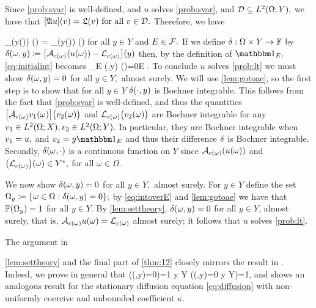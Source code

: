   

Since \cref{prob:svar} is well-defined, and $u$ solves \cref{prob:svar}, and $\D \subseteq \LtOY,$ we have that $\mleft[\SA u\mright](v) = \SL(v) \tforall v \in \D.$ Therefore, we have

\beq\label{eq:initialint}
\int_\Omega {}\mleft(y(\omega)\mright) \dd\PP(\omega) = \int_\Omega \mleft[\Lcomega\mright]\mleft(y(\omega)\mright) \dd\PP(\omega)
\eeq
for all $y \in Y$ and $E \in \mathcal F.$ If we define $\delta:\Omega\times Y \rightarrow \mathbb F$ by $\diff(\omega,y) \de \mleft[\Acomega\mleft(u(\omega)\mright) - \Lcomega\mright]\mleft(y\mright)$ then, by the definition of $\Ind{E},$ \eqref{eq:initialint} becomes
\beq\label{eq:intoverE}
\int_E \diff(\omega,y) \dd\PP(\omega)=0\quad \tforall E \in \cF.
\eeq
 To conclude $u$ solves \cref{prob:lt} we must show $\delta(\omega,y)=0$ for all $y \in Y,$ almost surely. We will use \cref{lem:gotoae}, so the first step is to show that for all $y \in Y$ $\delta(\cdot,y)$ is Bochner integrable. This follows from the fact that \cref{prob:svar} is well-defined, and thus the quantities $\big[\Acomega \vo(\omega)\big]\big(\vt(\omega)\big)$ and $\Lcomega\big(\vt(\omega)\big)$ are Bochner integrable for any $\vo\in \LtOX,\vt \in \LtOY.$ In particular, they are Bochner integrable when $v_{1}=u,$ and $\vt=y\Ind{E}$ and thus their difference $\delta$ is Bochner integrable. Secondly, $\delta(\omega,\cdot)$ is a continuous function on $Y$ since $\Acomega\mleft(u(\omega)\mright)$ and $\mleft(\Lcomega\mright)(\omega) \in \Ys,$ for all $\omega \in \Omega.$

We now show $\delta(\omega,y)=0$ for all $y \in Y,$ almost surely. For $y \in Y$ define the set $\Omegay \de \set{\omega \in \Omega \st \diff(\omega,y)=0};$ by \eqref{eq:intoverE} and \cref{lem:gotoae} we have that $\mathbb P(\Omega_{y})=1$ for all $y \in Y.$ By \cref{lem:settheory}, $  \delta(\omega,y)=0$ for all $y \in Y$, almost surely, that is, $\Acomega u(\omega) = \Lcomega$ almost surely; it follows that $u$ solves \cref{prob:lt}.
\epf

The argument in 

\noindent \cref{lem:settheory} and the final part of \cref{thm:12} closely mirrors the result in \cite[Remark 2.2]{MuSt:11}. Indeed, we prove in general that
\beqs
\PP\big(\diff(\omega,y)=0\big)=1 y \in Y \quad{} \quad\PP\big(\diff(\omega,y)=0 y \in Y\big)=1,
\eeqs
and \cite[Remark 2.2]{MuSt:11} shows an analogous result for the stationary diffusion equation \eqref{eq:diffusion} with non-uniformly coercive and unbounded coefficient $\kappa.$
\ere

